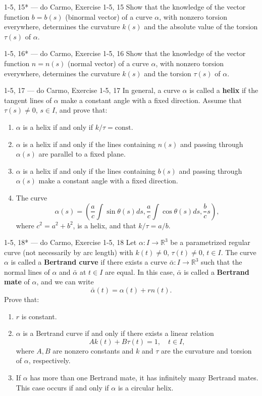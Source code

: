 \begin{exercise}{1-5, 15* — do Carmo, Exercise 1-5, 15}
Show that the knowledge of the vector function $b = b(s)$ (binormal vector) of a curve $\alpha$, with nonzero torsion everywhere, determines the curvature $k(s)$ and the absolute value of the torsion $\tau(s)$ of $\alpha$.
\end{exercise}

\begin{exercise}{1-5, 16* — do Carmo, Exercise 1-5, 16}
Show that the knowledge of the vector function $n = n(s)$ (normal vector) of a curve $\alpha$, with nonzero torsion everywhere, determines the curvature $k(s)$ and the torsion $\tau(s)$ of $\alpha$.
\end{exercise}

\begin{exercise}{1-5, 17 — do Carmo, Exercise 1-5, 17}
In general, a curve $\alpha$ is called a \textbf{helix} if the tangent lines of $\alpha$ make a constant angle with a fixed direction. Assume that $\tau(s) \neq 0$, $s \in I$, and prove that:
\begin{enumerate}
\item[a.] $\alpha$ is a helix if and only if $k/\tau = \mathrm{const}$.
\item[b.*] $\alpha$ is a helix if and only if the lines containing $n(s)$ and passing through $\alpha(s)$ are parallel to a fixed plane.
\item[c.*] $\alpha$ is a helix if and only if the lines containing $b(s)$ and passing through $\alpha(s)$ make a constant angle with a fixed direction.
\item[d.] The curve
\[
\alpha(s) = \left(\frac{a}{c}\int\sin\theta(s) ds, \frac{a}{c}\int\cos\theta(s) ds, \frac{b}{c}s\right),
\]
where $c^2 = a^2 + b^2$, is a helix, and that $k/\tau = a/b$.
\end{enumerate}
\end{exercise}

\begin{exercise}{1-5, 18* — do Carmo, Exercise 1-5, 18}
Let $\alpha: I \to \mathbb{R}^3$ be a parametrized regular curve (not necessarily by arc length) with $k(t) \neq 0$, $\tau(t) \neq 0$, $t \in I$. The curve $\alpha$ is called a \textbf{Bertrand curve} if there exists a curve $\bar{\alpha}: I \to \mathbb{R}^3$ such that the normal lines of $\alpha$ and $\bar{\alpha}$ at $t \in I$ are equal. In this case, $\bar{\alpha}$ is called a \textbf{Bertrand mate} of $\alpha$, and we can write
\[
\bar{\alpha}(t) = \alpha(t) + r n(t).
\]
Prove that:
\begin{enumerate}
\item[a.] $r$ is constant.
\item[b.] $\alpha$ is a Bertrand curve if and only if there exists a linear relation
\[
Ak(t) + B\tau(t) = 1, \quad t \in I,
\]
where $A, B$ are nonzero constants and $k$ and $\tau$ are the curvature and torsion of $\alpha$, respectively.
\item[c.] If $\alpha$ has more than one Bertrand mate, it has infinitely many Bertrand mates. This case occurs if and only if $\alpha$ is a circular helix.
\end{enumerate}
\end{exercise}

